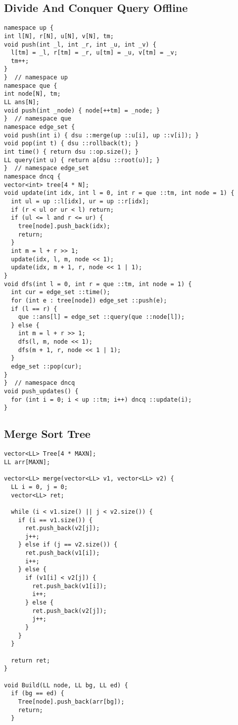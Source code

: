 \documentclass[FSZ,a4paper,onesided]{article}
\begin{document}
\begin{multicols*}{\COLS}
\subsection{Divide And Conquer Query Offline}
\begin{lstlisting}
namespace up {
int l[N], r[N], u[N], v[N], tm;
void push(int _l, int _r, int _u, int _v) {
  l[tm] = _l, r[tm] = _r, u[tm] = _u, v[tm] = _v;
  tm++;
}
}  // namespace up
namespace que {
int node[N], tm;
LL ans[N];
void push(int _node) { node[++tm] = _node; }
}  // namespace que
namespace edge_set {
void push(int i) { dsu ::merge(up ::u[i], up ::v[i]); }
void pop(int t) { dsu ::rollback(t); }
int time() { return dsu ::op.size(); }
LL query(int u) { return a[dsu ::root(u)]; }
}  // namespace edge_set
namespace dncq {
vector<int> tree[4 * N];
void update(int idx, int l = 0, int r = que ::tm, int node = 1) {
  int ul = up ::l[idx], ur = up ::r[idx];
  if (r < ul or ur < l) return;
  if (ul <= l and r <= ur) {
    tree[node].push_back(idx);
    return;
  }
  int m = l + r >> 1;
  update(idx, l, m, node << 1);
  update(idx, m + 1, r, node << 1 | 1);
}
void dfs(int l = 0, int r = que ::tm, int node = 1) {
  int cur = edge_set ::time();
  for (int e : tree[node]) edge_set ::push(e);
  if (l == r) {
    que ::ans[l] = edge_set ::query(que ::node[l]);
  } else {
    int m = l + r >> 1;
    dfs(l, m, node << 1);
    dfs(m + 1, r, node << 1 | 1);
  }
  edge_set ::pop(cur);
}
}  // namespace dncq
void push_updates() {
  for (int i = 0; i < up ::tm; i++) dncq ::update(i);
}
\end{lstlisting}
\subsection{Merge Sort Tree}
\begin{lstlisting}
vector<LL> Tree[4 * MAXN];
LL arr[MAXN];

vector<LL> merge(vector<LL> v1, vector<LL> v2) {
  LL i = 0, j = 0;
  vector<LL> ret;

  while (i < v1.size() || j < v2.size()) {
    if (i == v1.size()) {
      ret.push_back(v2[j]);
      j++;
    } else if (j == v2.size()) {
      ret.push_back(v1[i]);
      i++;
    } else {
      if (v1[i] < v2[j]) {
        ret.push_back(v1[i]);
        i++;
      } else {
        ret.push_back(v2[j]);
        j++;
      }
    }
  }

  return ret;
}

void Build(LL node, LL bg, LL ed) {
  if (bg == ed) {
    Tree[node].push_back(arr[bg]);
    return;
  }


\end{lstlisting}
\end{multicols*}
\end{document}
